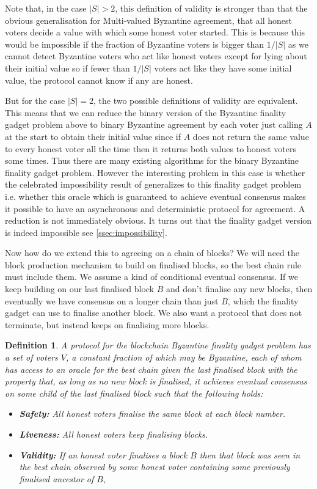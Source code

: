 \documentclass{article}
\newtheorem{definition}[theorem]{Definition}
\begin{document}
Note that, in the case $|S| > 2$, this definition of validity is stronger than that the obvious generalisation for Multi-valued Byzantine agreement, that all honest voters decide a value with which some honest voter started. This is because this would be impossible if the fraction of Byzantine voters is bigger than $1/|S|$ as we cannot detect Byzantine voters who act like honest voters except for lying about their initial value so if fewer than $1/|S|$ voters act like they have some initial value, the protocol cannot know if any are honest. 

But for the case $|S|=2$, the two possible definitions of validity are equivalent. This means that we can reduce the binary version of the Byzantine finality gadget problem above to binary Byzantine agreement by each voter just calling $A$ at the start to obtain their initial value since if $A$ does not return the same value to every honest voter all the time then it returns both values to honest voters some times. Thus there are many existing algorithms for the binary Byzantine finality gadget problem. However the interesting problem in this case is whether the celebrated impossibility result of \cite{flp} generalizes to this finality gadget problem i.e. whether this oracle which is guaranteed to achieve eventual consensus makes it possible to have an asynchronous and deterministic protocol for agreement. A reduction is not immediately obvious. It turns out that the finality gadget version is indeed impossible see \ref{ssec:impossibility}.

Now how do we extend this to agreeing on a chain of blocks? We will need the block production mechanism to build on finalised blocks, so the best chain rule must include them. We assume a kind of conditional eventual consensus. If we keep building on our last finalised block $B$ and don't finalise any new blocks, then eventually we have consensus on a longer chain than just $B$, which the finality gadget can use to finalise another block. We also want a protocol that does not terminate, but instead keeps on finalising more blocks. 

\begin{definition} A protocol for the blockchain Byzantine finality gadget problem has a set of voters $V$, a constant fraction of which may be Byzantine, each of whom has access to an oracle for the best chain given the last finalised block with the property that, as long as no new block is finalised, it achieves eventual consensus on some child of the last finalised block  such that the following holds:

\begin{itemize}
\item{\bf Safety:} All honest voters finalise the same block at each block number.
\item{\bf Liveness:} All honest voters keep finalising blocks.
\item{\bf Validity:} If an honest voter finalises a block $B$ then that block was seen in the best chain observed by some honest voter containing some previously finalised ancestor of $B$,
\end{itemize}

\end{definition}
\end{document}
